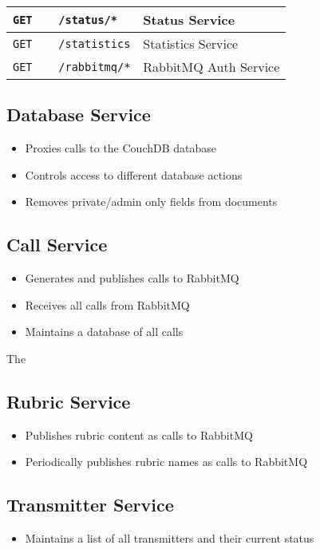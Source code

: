 \begin{center}
\begin{tabular}{|l|l|}
    \verb|GET    /status/*| & Status Service \\ \hline

    \verb|GET    /statistics| & Statistics Service \\ \hline

    \verb|GET    /rabbitmq/*| & RabbitMQ Auth Service \\ \hline
  \end{tabular}
\end{center}

\subsection{Database Service}
\begin{itemize}
\item Proxies calls to the CouchDB database
\item Controls access to different database actions
\item Removes private/admin only fields from documents
\end{itemize}

\subsection{Call Service}
\begin{itemize}
\item Generates and publishes calls to RabbitMQ
\item Receives all calls from RabbitMQ
\item Maintains a database of all calls
\end{itemize}

The

\subsection{Rubric Service}
\begin{itemize}
\item Publishes rubric content as calls to RabbitMQ
\item Periodically publishes rubric names as calls to RabbitMQ
\end{itemize}

\subsection{Transmitter Service}
\begin{itemize}
\item Maintains a list of all transmitters and their current status
\end{itemize}


